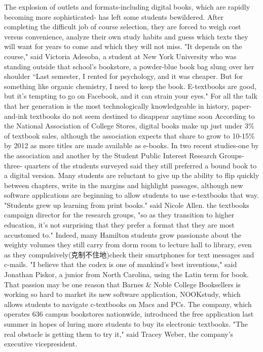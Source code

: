 \documentclass[UTF8,11pt]{ctexart}
\begin{document}
The explosion of outlets and formats-including digital books, which are rapidly becoming more sophisticated- has left some students bewildered. After completing the difficult job of course selection, they are forced to weigh cost versus convenience, analyze their own study habits and guess which texts they will want for years to come and which they will not miss. "It depends on the course," said Victoria Adesoba, a student at New York University who was standing outside that school's bookstore, a powder-blue book bag slung over her shoulder “Last semester, I rented for psychology, and it was cheaper. But for something like organic chemistry, I need to keep the book. E-textbooks are good, but it's tempting to go on Facebook, and it can strain your eyes." For all the talk that her generation is the most technologically knowledgeable in history, paper-and-ink textbooks do not seem destined to disappear anytime soon According to the National Association of College Stores, digital books make up just under 3\% of textbook sales, although the association expects that share to grow to 10-15\% by 2012 as more titles are made available as e-books. In two recent studies-one by the association and another by the Student Public Interest Research Groups-three- quarters of the students surveyed said they still preferred a bound book to a digital version. Many students are reluctant to give up the ability to flip quickly between chapters, write in the margins and highlight passages, although new software applications are beginning to allow students to use e-textbooks that way. "Students grew up learning from print books." said Nicole Allen. the textbooks campaign director for the research groups, "so as they transition to higher education, it's not surprising that they prefer a format that they are most accustomed to." Indeed, many Hamilton students grow passionate about the weighty volumes they still carry from dorm room to lecture hall to library, even as they compulsively(克制不住地)check their smartphones for text messages and c-mails. "I believe that the codex is one of mankind's best inventions," said Jonathan Piskor, a junior from North Carolina, using the Latin term for book. That passion may be one reason that Barnes \& Noble College Booksellers is working so hard to market its new software application, NOOKstudy, which allows students to navigate c-textbooks on Macs and PCs. The company, which operates 636 campus bookstores nationwide, introduced the free application last summer in hopes of luring more students to buy its electronic textbooks. "The real obstacle is getting them to try it," said Tracey Weber, the company's executive vicepresident.
\end{document}
